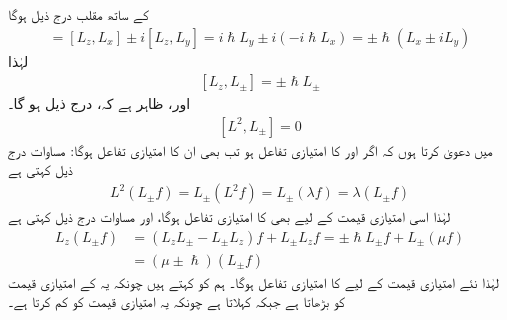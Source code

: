  کے ساتھ مقلب درج ذیل ہوگا 
\begin{align*} 
[L_z, L_{\pm}] = [L_z, L_x] \pm i [L_z, L_y] = i \hslash L_y \pm i (- i \hslash L_x) = \pm \hslash (L_x \pm i L_y)
\end{align*}
لہٰذا 
\begin{align}\label{مساوات_تین_ابعادی_ایک_اور_سیڑھی}
[L_z, L_{\pm}] = \pm \hslash L_{\pm}
\end{align}
اور، ظاہر ہے کہ، درج ذیل ہو گا۔ 
\begin{align}\label{مساوات_تین_ابعادی_مربع_اور_سیڑھی}
[L^2, L_{\pm}] = 0
\end{align}
میں دعویٰ کرتا ہوں کہ اگر  اور  کا امتیازی تفاعل  ہو تب  بھی ان کا امتیازی تفاعل ہوگا: مساوات درج ذیل کہتی ہے 
\begin{align}
L^2 (L_{\pm} f) = L_{\pm} (L^2 f) = L_{\pm} (\lambda f) = \lambda (L_{\pm} f)
\end{align}
لہٰذا اسی امتیازی قیمت  کے لیے  بھی  کا امتیازی تفاعل ہوگا، اور مساوات  درج ذیل کہتی ہے 
\begin{align}
L_z (L_{\pm} f) &= (L_z L_{\pm} - L_{\pm} L_z) f + L_{\pm} L_z f = \pm \hslash L_\pm f + L_{\pm} (\mu f) \nonumber \\
&= (\mu \pm \hslash ) (L_{\pm} f)
\end{align}
لہٰذا نئے امتیازی قیمت  کے لیے  کا  امتیازی تفاعل ہوگا۔ ہم  کو  کہتے ہیں چونکہ یہ  کے امتیازی قیمت کو  بڑھاتا ہے جبکہ   کہلاتا ہے چونکہ یہ امتیازی قیمت کو  کم کرتا ہے۔

